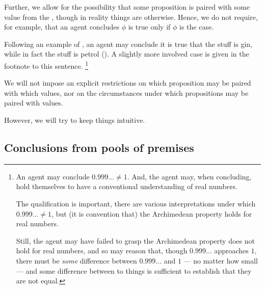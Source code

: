 \begin{note}
  Further, we allow for the possibility that some proposition is paired with some value from the \agpe{}, though in reality things are otherwise.
  Hence, we do not require, for example, that an agent concludes \(\phi\) is true only if \(\phi\) is the case.

  Following an example of \citeauthor{Williams:1979wi}, an agent may conclude it is true that the stuff is gin, while in fact the stuff is petrol (\citeyear[18]{Williams:1979wi}).
  A slightly more involved case is given in the footnote to this sentence.%
  \footnote{
    An agent may conclude \(0.999\dots \ne 1\).
    And, the agent may, when concluding, hold themselves to have a conventional understanding of real numbers.

    The qualification is important, there are various interpretations under which \(0.999\dots \ne 1\), but (it is convention that) the Archimedean property holds for real numbers.

    Still, the agent may have failed to grasp the Archimedean property does not hold for real numbers, and so may reason that, though \(0.999\dots\) approaches \(1\), there must be \emph{some} difference between \(0.999\dots\) and \(1\) --- no matter how small --- and some difference between to things is sufficient to establish that they are not equal.
  }
\end{note}

\begin{note}
  We will not impose an explicit restrictions on which proposition may be paired with which values, nor on the circumstances under which propositions may be paired with values.

  However, we will try to keep things intuitive.
\end{note}

\subsection{Conclusions from pools of premises}
\label{sec:pools-premises}

